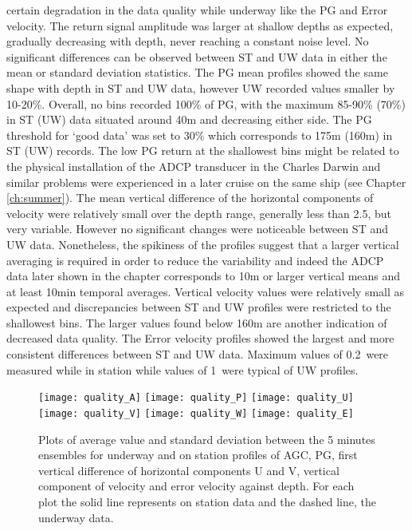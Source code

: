 certain degradation in the data quality while underway like the PG
and Error velocity. The return signal amplitude was larger at
shallow depths as expected, gradually decreasing with depth, never
reaching a constant noise level. No significant differences can be
observed between ST and UW data in either the mean or standard
deviation statistics. The PG mean profiles showed the same shape
with depth in ST and UW data, however UW recorded values smaller
by 10-20\%. Overall, no bins recorded 100\% of PG, with the
maximum 85-90\% (70\%) in ST (UW) data situated around 40m and
decreasing either side. The PG threshold for `good data' was set
to 30\% which corresponds to 175m (160m) in ST (UW) records. The
low PG return at the shallowest bins might be related to the
physical installation of the ADCP transducer in the Charles Darwin
and similar problems were experienced in a later cruise on the
same ship (see Chapter \ref{ch:summer}). The mean vertical
difference of the horizontal components of velocity were
relatively small over the depth range, generally less than
2.5\velc, but very variable. However no significant changes were
noticeable between ST and UW data. Nonetheless, the spikiness of
the profiles suggest that a larger vertical averaging is required
in order to reduce the variability and indeed the ADCP data later
shown in the chapter corresponds to 10m or larger vertical means
and at least 10min temporal averages. Vertical velocity values
were relatively small as expected and discrepancies between ST and
UW profiles were restricted to the shallowest bins. The larger
values found below 160m are another indication of decreased data
quality. The Error velocity profiles showed the largest and more
consistent differences between ST and UW data. Maximum values of
0.2\velc\, were measured while in station while values of 1\velc\,
were typical of UW profiles.

\begin{figure}[t]
\texttt{[image: quality\_A]}%
\texttt{[image: quality\_P]}
\texttt{[image: quality\_U]}%
\texttt{[image: quality\_V]}
\texttt{[image: quality\_W]}%
\texttt{[image: quality\_E]}
\caption{Plots of average value and standard deviation between the
5 minutes ensembles for underway and on station profiles of AGC,
PG, first vertical difference of horizontal components U and V,
vertical component of velocity and error velocity against depth.
For each plot the solid line represents on station data and the
dashed line, the underway data.} \label{fig:cd105qual}
\end{figure}

